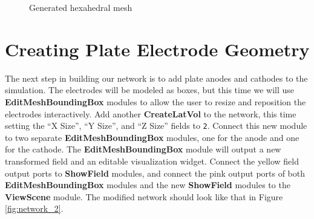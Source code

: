 \documentclass[fleqn,11pt,openany]{book}
\begin{document}
\begin{figure}
\caption{Generated hexahedral mesh}\label{fig:step_1_results}
\end{figure}

\section{Creating Plate Electrode Geometry}

The next step in building our network is to add plate anodes and
cathodes to the simulation. The electrodes will be modeled as boxes,
but this time we will use {\bf EditMeshBoundingBox} modules to allow
the user to resize and reposition the electrodes interactively.  Add
another {\bf CreateLatVol} to the network, this time setting the ``X Size'', ``Y Size'', and ``Z Size'' fields to {\tt 2}.
Connect this new module to two separate {\bf
EditMeshBoundingBox} modules, one for the anode and one for the
cathode. The {\bf EditMeshBoundingBox} module will output a new
transformed field and an editable visualization widget. Connect the
yellow field output ports to {\bf ShowField} modules, and connect the
pink output ports of both {\bf EditMeshBoundingBox} modules and the
new {\bf ShowField} modules to the {\bf ViewScene} module. The
modified network should look like that in Figure \ref{fig:network_2}.
\end{document}
